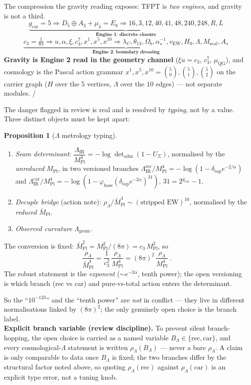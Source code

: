 \documentclass[11pt,a4paper]{article}
\newcommand{\Mpl}{M_{\mathrm{Pl}}}
\newcommand{\Mbar}{\bar M_{\mathrm{Pl}}}
\newcommand{\gcar}{g_{\mathrm{car}}}
\newcommand{\cthree}{c_3}
\newcommand{\ainv}{\alpha^{-1}_\star}
\theoremstyle{definition}
\newtheorem{proposition}{Proposition}
\begin{document}
\begin{winbox}
The compression the gravity reading exposes: TFPT is \emph{two engines}, and gravity is not a third.
\[
  \underbrace{\gcar{=}5\Rightarrow D_5{\oplus}A_3{+}\mu_4{=}E_8\Rightarrow16,3,12,40,41,48,240,248,R,L}_{\textbf{Engine 1: discrete closure}}
\]
\[
  \underbrace{\cthree{=}\tfrac1{8\pi}\Rightarrow u,\alpha,\xi,\cthree^7,x^1,x^5,x^{10}\Rightarrow\lambda_C,\theta_{13},\Omega_b,\ainv,v_{\mathrm{EW}},H_0,\Lambda,M_{\mathrm{scal}},A_s}_{\textbf{Engine 2: boundary dressing}}
\]
\textbf{Gravity is Engine 2 read in the geometry channel} ($\xi u=\cthree$, $\cthree^7$, $\mu_{\mathrm{QG}}$),
and cosmology is the Pascal action grammar $x^1,x^5,x^{10}=\binom50,\binom51,\binom52$ on the carrier
graph ($H$ over the $5$ vertices, $\Lambda$ over the $10$ edges) --- not separate modules. \mE/\mC
\end{winbox}
The danger flagged in review is real and is resolved by \emph{typing}, not by a value. Three distinct
objects must be kept apart:
\begin{proposition}[$\Lambda$ metrology typing]
\label{prop:lambda}
\begin{enumerate}[leftmargin=1.6em]
\item \emph{Seam determinant}: $\dfrac{\Lambda_{\mathrm{IR}}}{\Mpl^4}=-\log\det\nolimits_{\mathrm{adm}}(1-U_\Sigma)$,
  normalised by the \emph{unreduced} $\Mpl$, in two versioned branches
  $\Lambda^{\mathrm{rec}}_{\mathrm{IR}}/\Mpl^4=-\log(1-\delta_{\mathrm{top}}e^{-2/\alpha})$ and
  $\Lambda^{\mathrm{car}}_{\mathrm{IR}}/\Mpl^4=-\log(1-\varphi_{\mathrm{base}}(\delta_{\mathrm{top}}e^{-2\alpha})^{31})$,
  $31=2^{\gcar}-1$.
\item \emph{Decuple bridge} (action note): $\rho_\Lambda/\Mbar^4\sim(\text{stripped EW})^{10}$, normalised
  by the \emph{reduced} $\Mbar$.
\item \emph{Observed curvature} $\Lambda_{\mathrm{geom}}$.
\end{enumerate}
The conversion is fixed: $\Mbar^2=\Mpl^2/(8\pi)=\cthree\,\Mpl^2$, so
\[
  \boxed{\ \frac{\rho_\Lambda}{\Mbar^4}=\frac1{\cthree^2}\,\frac{\rho_\Lambda}{\Mpl^4}=(8\pi)^2\,\frac{\rho_\Lambda}{\Mpl^4}\ }.
\]
The robust statement is the \emph{exponent} ($\sim e^{-2\alpha}$, tenth power); the open versioning is
which branch (rec vs car) and pure-vs-total action enters the determinant. \mC
\end{proposition}

\noindent So the ``$10^{-123}$'' and the ``tenth power'' are \emph{not} in conflict --- they live in
different normalisations linked by $(8\pi)^2$; the only genuinely open choice is the branch label.
\smallskip\\
\noindent\textbf{Explicit branch variable (review discipline).} To prevent silent branch-hopping, the open
choice is carried as a named variable $B_\Lambda\in\{\mathrm{rec},\mathrm{car}\}$, and every cosmological-$\Lambda$
statement is written $\rho_\Lambda(B_\Lambda)$ --- never a bare $\rho_\Lambda$. A claim is only comparable to
data once $B_\Lambda$ is fixed; the two branches differ by the structural factor noted above, so quoting
$\rho_\Lambda(\mathrm{rec})$ against $\rho_\Lambda(\mathrm{car})$ is an explicit type error, not a tuning knob.
\end{document}
